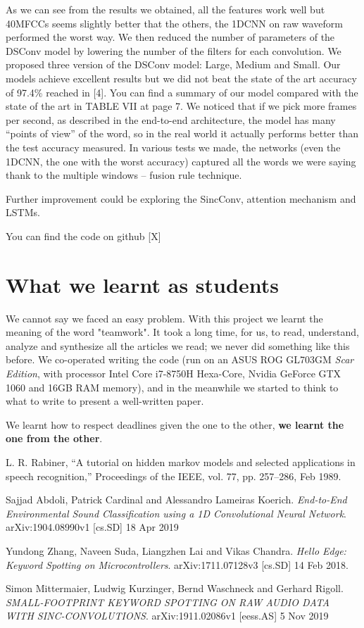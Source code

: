 \documentclass[conference]{IEEEtran}
\begin{document}
As we can see from the results we obtained, all the features work well but 40MFCCs seems slightly better that the others, the 1DCNN on raw waveform performed the worst way.
We then reduced the number of parameters of the DSConv model by lowering the number of the filters for each convolution. We proposed three version of the DSConv model: Large, Medium and Small.
Our models achieve excellent results but we did not beat the state of the art accuracy of 97.4\% reached in [4]. You can find a summary of our model compared with the state of the art in TABLE VII at page 7.
We noticed that if we pick more frames per second, as described in the end-to-end architecture, the model has many “points of view” of the word, so in the real world it actually performs better than the test accuracy measured. In various tests we made, the networks (even the 1DCNN, the one with the worst accuracy) captured all the words we were saying thank to the multiple windows – fusion rule technique.

Further improvement could be exploring the SincConv, attention mechanism and LSTMs.

You can find the code on github [X]

\section*{What we learnt as students}
We cannot say we faced an easy problem. With this project we learnt the meaning of the word "teamwork". It took a long time, for us, to read, understand, analyze and synthesize all the articles we read; we never did something like this before. We co-operated writing the code (run on an ASUS ROG GL703GM \textit{Scar Edition}, with processor Intel Core i7-8750H Hexa-Core, Nvidia  GeForce GTX 1060 and 16GB RAM memory), and in the meanwhile we started to think to what to write to present a well-written paper.

We learnt how to respect deadlines given the one to the other, \textbf{we learnt the one from the other}.

\begin{thebibliography}{1}
L. R. Rabiner, “A tutorial on hidden markov models and selected applications in speech recognition,” Proceedings of the IEEE, vol. 77, pp. 257–286, Feb 1989.

Sajjad Abdoli, Patrick Cardinal and Alessandro Lameiras Koerich. \textit{End-to-End Environmental Sound Classification using a 1D Convolutional Neural Network}. arXiv:1904.08990v1 [cs.SD] 18 Apr 2019

Yundong Zhang, Naveen Suda, Liangzhen Lai and Vikas Chandra. \textit{Hello Edge: Keyword Spotting on Microcontrollers}. arXiv:1711.07128v3 [cs.SD] 14 Feb 2018.

Simon Mittermaier, Ludwig Kurzinger, Bernd Waschneck and Gerhard Rigoll. \textit{SMALL-FOOTPRINT KEYWORD SPOTTING ON RAW AUDIO DATA WITH SINC-CONVOLUTIONS}. arXiv:1911.02086v1 [eess.AS] 5 Nov 2019

\end{thebibliography}
\end{document}
